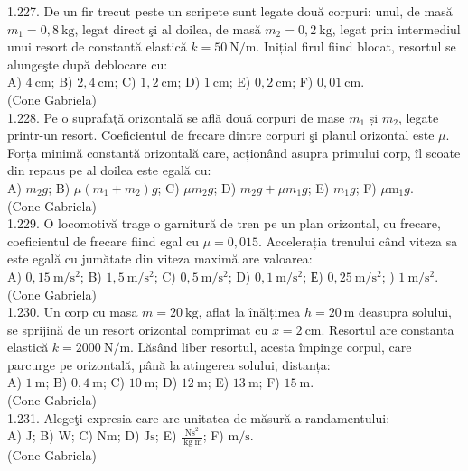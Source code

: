 {1.227. De un fir trecut peste un scripete sunt legate două corpuri: unul, de masă $m_{1}=0,8 \mathrm{~kg}$, legat direct şi al doilea, de masă $m_{2}=0,2 \mathrm{~kg}$, legat prin intermediul unui resort de constantă elastică $k=50 \mathrm{~N} / \mathrm{m}$. Inițial firul fiind blocat, resortul se alungeşte după deblocare cu:\\ A) $4 \mathrm{~cm}$; B) $2,4 \mathrm{~cm}$; C) $1,2 \mathrm{~cm}$; D) $1 \mathrm{~cm}$; E) $0,2 \mathrm{~cm}$; F) $0,01 \mathrm{~cm}$.\\ (Cone Gabriela)\\

1.228. Pe o suprafaţă orizontală se află două corpuri de mase $m_{1}$ și $m_{2}$, legate printr-un resort. Coeficientul de frecare dintre corpuri şi planul orizontal este $\mu$. Forța minimă constantă orizontală care, acționând asupra primului corp, îl scoate din repaus pe al doilea este egală cu:\\ A) $m_{2} g$; B) $\mu\left(m_{1}+m_{2}\right) g$; C) $\mu m_{2} g$; D) $m_{2} g+\mu m_{1} g$; E) $m_{1} g$; F) $\mu \mathrm{m}_{1} g$.\\ (Cone Gabriela)\\

1.229. O locomotivă trage o garnitură de tren pe un plan orizontal, cu frecare, coeficientul de frecare fiind egal cu $\mu=0,015$. Accelerația trenului când viteza sa este egală cu jumătate din viteza maximă are valoarea:\\ A) $0,15 \mathrm{~m} / \mathrm{s}^{2}$; B) $1,5 \mathrm{~m} / \mathrm{s}^{2}$; C) $0,5 \mathrm{~m} / \mathrm{s}^{2}$; D) $0,1 \mathrm{~m} / \mathrm{s}^{2}$; Е) $0,25 \mathrm{~m} / \mathrm{s}^{2}$; ) $1 \mathrm{~m} / \mathrm{s}^{2}$.\\ (Cone Gabriela)\\

1.230. Un corp cu masa $m=20 \mathrm{~kg}$, aflat la înălțimea $h=20 \mathrm{~m}$ deasupra solului, se sprijină de un resort orizontal comprimat cu $x=2 \mathrm{~cm}$. Resortul are constanta elastică $k=2000 \mathrm{~N} / \mathrm{m}$. Lăsând liber resortul, acesta împinge corpul, care parcurge pe orizontală, până la atingerea solului, distanța:\\ A) $1 \mathrm{~m}$; B) $0,4 \mathrm{~m}$; C) $10 \mathrm{~m}$; D) $12 \mathrm{~m}$; E) $13 \mathrm{~m}$; F) $15 \mathrm{~m}$.\\ (Cone Gabriela)\\

1.231. Alegeţi expresia care are unitatea de măsură a randamentului:\\ A) $\mathrm{J}$; B) $\mathrm{W}$; C) $\mathrm{Nm}$; D) $\mathrm{Js}$; E) $\frac{\mathrm{Ns}^{2}}{\mathrm{~kg} \mathrm{~m}}$; F) $\mathrm{m} / \mathrm{s}$.\\ (Cone Gabriela)\\

}
